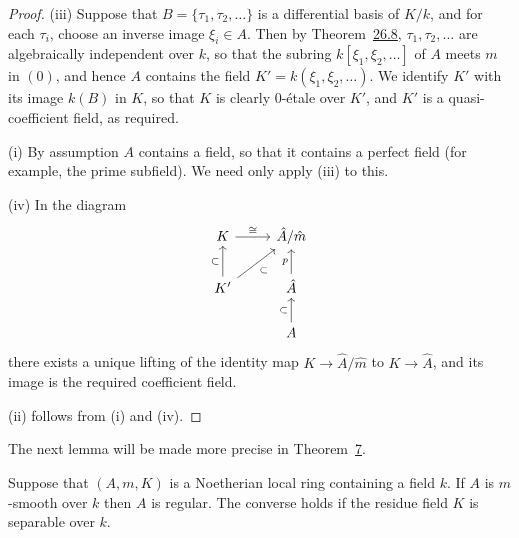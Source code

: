 \begin{proof}
(iii) Suppose that $B = \{\tau_1, \tau_2, \ldots\}$ is a differential basis of $K/k$, and for
each $\tau_i$, choose an inverse image $\xi_i \in A$. Then by
Theorem~\hyperref[thm:26.8]{26.8}, $\tau_1, \tau_2, \ldots$ are algebraically independent over $k$, so
that the subring $k[\xi_1, \xi_2, \ldots]$ of $A$ meets $m$ in $(0)$, and hence $A$ contains
the field $K' = k(\xi_1, \xi_2, \ldots)$. We identify $K'$ with its image $k(B)$ in $K$, so that
$K$ is clearly 0-\'etale over $K'$, and $K'$ is a quasi-coefficient field, as required.

(i) By assumption $A$ contains a field, so that it contains a perfect field (for
example, the prime subfield). We need only apply (iii) to this.

(iv) In the diagram
\[
\begin{tikzcd}
K \arrow[r, "\cong"] & \hat{A}/\hat{m} \\
K' \arrow[u, "\subset"] \arrow[ru, "\subset"'] & \hat{A} \arrow[u, "p"] \\
& A \arrow[u, "\subset"]
\end{tikzcd}
\]
there exists a unique lifting of the identity map $K \to \hat{A}/\hat{m}$ to $K \to \hat{A}$,
and its image is the required coefficient field.

(ii) follows from (i) and (iv).
\end{proof}

The next lemma will be made more precise in Theorem~\hyperref[thm:28.7]{7}.

\begin{lemma}\label{lem:28.1}
Suppose that $(A, m, K)$ is a Noetherian local ring containing a field $k$. If $A$ is
$m$-smooth over $k$ then $A$ is regular. The converse holds if the residue field $K$
is separable over $k$.
\end{lemma}

